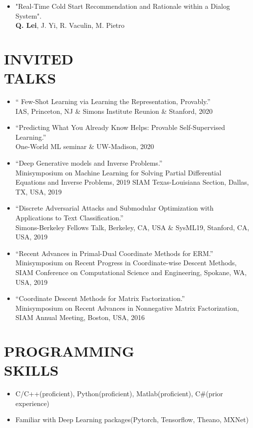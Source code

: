 \documentclass[margin, 10pt]{res} %
\begin{document}
\begin{resume}
\begin{itemize}
 \item{"Real-Time Cold Start Recommendation and Rationale within a Dialog System".\\
   \textbf{Q. Lei}, J. Yi, R. Vaculin, M. Pietro}
 \end{itemize}

 \section{INVITED\\TALKS}
 \begin{itemize}
	\item{`` Few-Shot Learning via Learning the Representation, Provably.''\\
		IAS, Princeton, NJ \& Simons Institute Reunion \& Stanford, 2020	}
	 \item{``Predicting What You Already Know Helps: Provable Self-Supervised Learning.''\\
		 One-World ML seminar \& UW-Madison, 2020	 } 
\item{``Deep Generative models and Inverse Problems.''\\
       Minisymposium on Machine Learning for Solving Partial Differential 
       Equations and Inverse Problems, 2019 SIAM Texas-Louisiana Section, Dallas,
 TX, USA, 2019}

 \item{``Discrete Adversarial Attacks 
 and Submodular Optimization with Applications to Text Classification.''\\ 
 Simons-Berkeley Fellows Talk, Berkeley, CA, USA \& SysML19, Stanford, CA, 
 USA, 2019}

 \item{``Recent 
     Advances in Primal-Dual Coordinate Methods for ERM.''\\
     Minisymposium on Recent Progress in Coordinate-wise Descent Methods, SIAM Conference on Computational Science and Engineering, Spokane, WA, USA, 2019}
 
 \item{``Coordinate Descent Methods for Matrix Factorization.''\\
   Minisymposium on Recent Advances in Nonnegative Matrix Factorization, SIAM 
 Annual Meeting, Boston, USA, 2016}


 \end{itemize}

\section{PROGRAMMING \\ SKILLS} 
\begin{itemize}
	\item[]  C/C++(proficient), Python(proficient), Matlab(proficient), C\#(prior experience)
  \item[]  Familiar with Deep Learning packages(Pytorch, Tensorflow, Theano, MXNet)
\end{itemize}

\end{resume}
\end{document}
